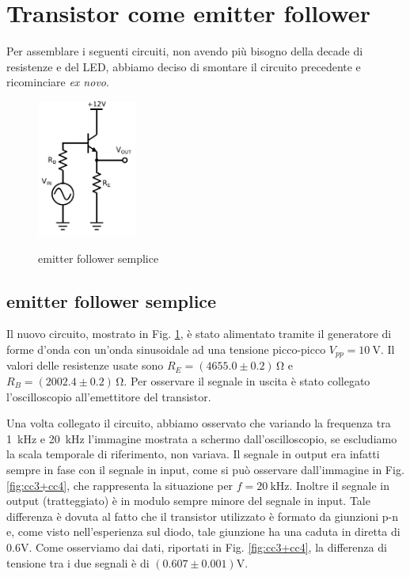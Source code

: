 \section{Transistor come emitter follower}

Per assemblare i seguenti circuiti, non avendo più bisogno della decade di resistenze e del LED, abbiamo deciso di smontare il circuito precedente e ricominciare \emph{ex novo}.

\begin{figure}
	\caption{emitter follower semplice}
	\includegraphics[height=45mm]{cc3.pdf}
	\label{fig:cc3}
\end{figure}

\subsection{emitter follower semplice}
Il nuovo circuito, mostrato in Fig. \ref{fig:cc3}, è stato alimentato tramite il generatore di forme d'onda con un'onda sinusoidale ad una tensione picco-picco $V_{pp} = \SI{10}{\volt}$.
Il valori delle resistenze usate sono $R_E = (4655.0 \pm 0.2)\,\si{\ohm}$ e $R_B = (2002.4 \pm 0.2)\,\si{\ohm}$.
Per osservare il segnale in uscita è stato collegato l'oscilloscopio all'emettitore del transistor.

Una volta collegato il circuito, abbiamo osservato che variando la frequenza tra \SI{1}{\kilo\hertz} e \SI{20}{\kilo\hertz} l'immagine mostrata a schermo dall'oscilloscopio, se escludiamo la scala temporale di riferimento, non variava.
Il segnale in output era infatti sempre in fase con il segnale in input, come si può osservare dall'immagine in Fig. \ref{fig:cc3+cc4}, che rappresenta la situazione per $f = \SI{20}{\kilo\hertz}$.
Inoltre il segnale in output (tratteggiato) è in modulo sempre minore del segnale in input.
Tale differenza è dovuta al fatto che il transistor utilizzato è formato da giunzioni p-n e, come visto nell'esperienza sul diodo, tale giunzione ha una caduta in diretta di $0.6\si{\volt}$.
Come osserviamo dai dati, riportati in Fig. \ref{fig:cc3+cc4}, la differenza di tensione tra i due segnali è di $(0.607\pm0.001)\si{\volt}$.

